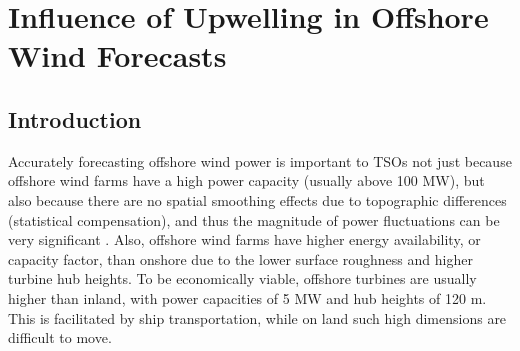 \chapter{Influence of Upwelling in Offshore Wind Forecasts}
\label{sec:offshore}


\section{Introduction}

Accurately forecasting offshore wind power is important to TSOs not just because offshore wind farms have a high power capacity (usually above 100 MW), but also because there are no spatial smoothing effects due to topographic differences (statistical compensation), and thus the magnitude of power fluctuations can be very significant \citep{Pinson2008}. Also, offshore wind farms have higher energy availability, or capacity factor, than onshore due to the lower surface roughness and higher turbine hub heights. To be economically viable, offshore turbines are usually higher than inland, with power capacities of 5 MW and hub heights of 120 m. This is facilitated by ship transportation, while on land such high dimensions are difficult to move.

